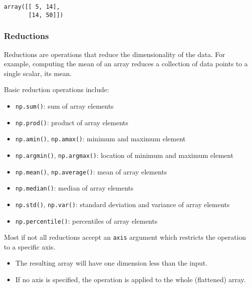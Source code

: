\documentclass[10pt]{scrartcl}
\makeatletter
\providecommand{\tightlist}{%
      \setlength{\itemsep}{0pt}\setlength{\parskip}{0pt}}
\newcommand{\boxspacing}{\kern\kvtcb@left@rule\kern\kvtcb@boxsep}
\newcommand{\prompt}[4]{
        {\ttfamily\llap{{\color{#2}[#3]:\hspace{3pt}#4}}\vspace{-\baselineskip}}
    }
\makeatother
\begin{document}
            \begin{tcolorbox}[breakable, size=fbox, boxrule=.5pt, pad at break*=1mm, opacityfill=0]
\prompt{Out}{outcolor}{37}{\boxspacing}
\begin{Verbatim}[commandchars=\\\{\}]
array([[ 5, 14],
       [14, 50]])
\end{Verbatim}
\end{tcolorbox}
        
    \hypertarget{reductions}{%
\subsubsection{Reductions}\label{reductions}}

Reductions are operations that reduce the dimensionality of the data.
For example, computing the mean of an array reduces a collection of data
points to a single scalar, its mean.

Basic reduction operations include:

\begin{itemize}
\tightlist
\item
  \texttt{np.sum()}: sum of array elements
\item
  \texttt{np.prod()}: product of array elements
\item
  \texttt{np.amin()}, \texttt{np.amax()}: minimum and maximum element
\item
  \texttt{np.argmin()}, \texttt{np.argmax()}: location of minimum and
  maximum element
\item
  \texttt{np.mean()}, \texttt{np.average()}: mean of array elements
\item
  \texttt{np.median()}: median of array elements
\item
  \texttt{np.std()}, \texttt{np.var()}: standard deviation and variance
  of array elements
\item
  \texttt{np.percentile()}: percentiles of array elements
\end{itemize}

Most if not all reductions accept an \texttt{axis} argument which
restricts the operation to a specific axis.

\begin{itemize}
\tightlist
\item
  The resulting array will have one dimension less than the input.
\item
  If no axis is specified, the operation is applied to the whole
  (flattened) array.
\end{itemize}
\end{document}
